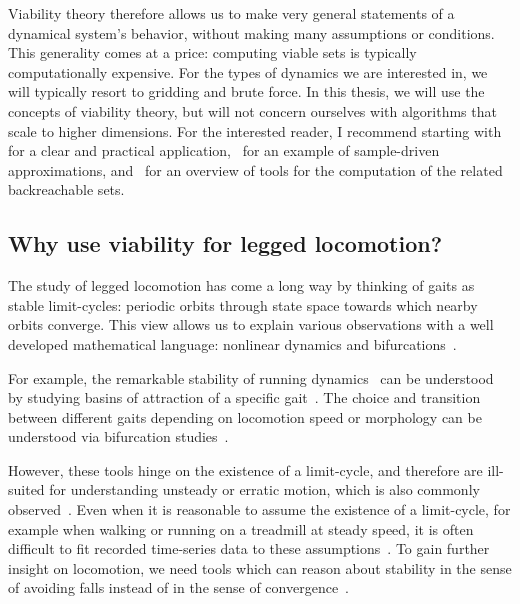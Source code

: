 Viability theory therefore allows us to make very general statements of a dynamical system's behavior, without making many assumptions or conditions. This generality comes at a price: computing viable sets is typically computationally expensive. For the types of dynamics we are interested in, we will typically resort to gridding and brute force. In this thesis, we will use the concepts of viability theory, but will not concern ourselves with algorithms that scale to higher dimensions. For the interested reader, I recommend starting with~\cite{liniger2017real} for a clear and practical application,~\cite{deffuant2007approximating} for an example of sample-driven approximations, and~\cite{bansal2017hamilton} for an overview of tools for the computation of the related backreachable sets.

\subsection{Why use viability for legged locomotion?}

The study of legged locomotion has come a long way by thinking of gaits as stable limit-cycles: periodic orbits through state space towards which nearby orbits converge. This view allows us to explain various observations with a well developed mathematical language: nonlinear dynamics and bifurcations~\cite{strogatz2018nonlinear}. \par
For example, the remarkable stability of running dynamics~\cite{daley2006running} can be understood by studying basins of attraction of a specific gait~\cite{merker2015stable,cnops2015basin}. The choice and transition between different gaits depending on locomotion speed or morphology can be understood via bifurcation studies~\cite{owaki2013simple,aoi2013stability,gan2018all}. \par

However, these tools hinge on the existence of a limit-cycle, and therefore are ill-suited for understanding unsteady or erratic motion, which is also commonly observed~\cite{wheatley2015escape,moore2017unpredictability}.
Even when it is reasonable to assume the existence of a limit-cycle, for example when walking or running on a treadmill at steady speed, it is often difficult to fit recorded time-series data to these assumptions~\cite{bruijn2013assessing, maus2015constructing}. To gain further insight on locomotion, we need tools which can reason about stability in the sense of avoiding falls instead of in the sense of convergence~\cite{Birn-Jeffery3786}. \par

